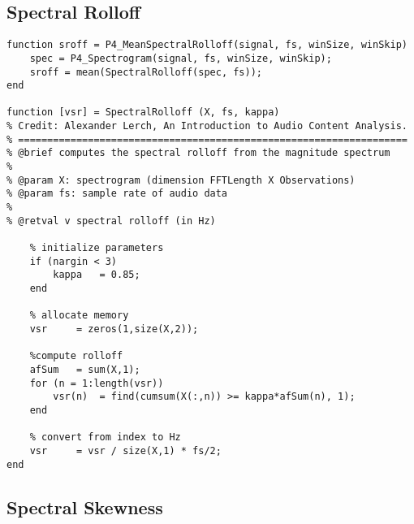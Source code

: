 \subsection{Spectral Rolloff}
\label{app:feat-rolloff}

\begin{lstlisting}[caption=Matlab implementation of the spectral rolloff., label=snippet-specrolloff]
function sroff = P4_MeanSpectralRolloff(signal, fs, winSize, winSkip)
    spec = P4_Spectrogram(signal, fs, winSize, winSkip);
    sroff = mean(SpectralRolloff(spec, fs));
end

function [vsr] = SpectralRolloff (X, fs, kappa)
% Credit: Alexander Lerch, An Introduction to Audio Content Analysis.
% ===================================================================
% @brief computes the spectral rolloff from the magnitude spectrum
%
% @param X: spectrogram (dimension FFTLength X Observations)
% @param fs: sample rate of audio data 
%
% @retval v spectral rolloff (in Hz)

    % initialize parameters
    if (nargin < 3)
        kappa   = 0.85;
    end
 
    % allocate memory
    vsr     = zeros(1,size(X,2));
 
    %compute rolloff
    afSum   = sum(X,1);
    for (n = 1:length(vsr))
        vsr(n)  = find(cumsum(X(:,n)) >= kappa*afSum(n), 1); 
    end
 
    % convert from index to Hz
    vsr     = vsr / size(X,1) * fs/2;
end
\end{lstlisting}

\subsection{Spectral Skewness}
\label{app:feat-skewness}

